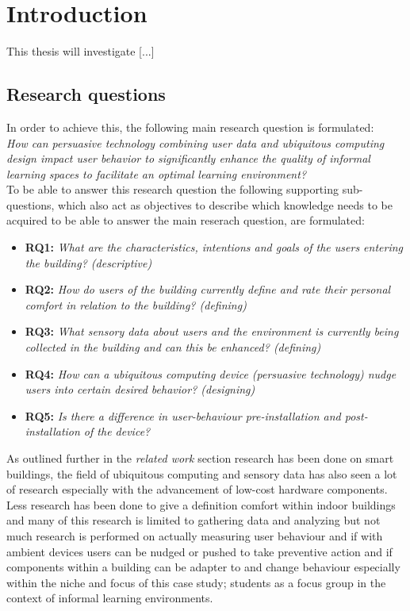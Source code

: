 \section{Introduction}

This thesis will investigate [...] 

\subsection{Research questions}

In order to achieve this, the following main research question is formulated: \\

\emph{How can persuasive technology combining user data and ubiquitous computing design impact user behavior to significantly enhance the quality of informal learning spaces to facilitate an optimal learning environment?} \\

To be able to answer this research question the following supporting sub-questions, which also act as objectives to describe which knowledge needs to be acquired to be able to answer the main reserach question, are formulated:

\begin{itemize}
    \item \textbf{RQ1:} \emph{What are the characteristics, intentions and goals of the users entering the building? (descriptive)}
    \item \textbf{RQ2:} \emph{How do users of the building currently define and rate their personal comfort in relation to the building? (defining)}
    \item \textbf{RQ3:} \emph{What sensory data about users and the environment is currently being collected in the building and can this be enhanced? (defining)}
    \item \textbf{RQ4:} \emph{How can a ubiquitous computing device (persuasive technology) nudge users into certain desired behavior? (designing)}
    \item \textbf{RQ5:} \emph{Is there a difference in user-behaviour pre-installation and post-installation of the device?}
\end{itemize}

As outlined further in the \emph{related work} section research has been done on smart buildings, the field of ubiquitous computing and sensory data has also seen a lot of research especially with the advancement of low-cost hardware components. Less research has been done to give a definition comfort within indoor buildings and many of this research is limited to gathering data and analyzing but not much research is performed on actually measuring user behaviour and if with ambient devices users can be nudged or pushed to take preventive action and if components within a building can be adapter to and change behaviour especially within the niche and focus of this case study; students as a focus group in the context of informal learning environments.

